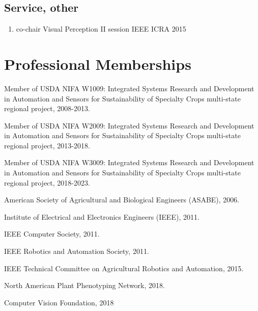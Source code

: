 \documentclass[letterpaper,11pt]{article}
\begin{document}
\subsection{Service, other}
\begin{enumerate}[noitemsep, leftmargin=*,label={}]
\item{co-chair Visual Perception II session IEEE ICRA 2015}
\end{enumerate}

\section{Professional Memberships}
\begin{enumerate}[noitemsep, leftmargin=*,label={[\arabic*]}]
\item{Member of USDA NIFA W1009: Integrated Systems Research and Development in Automation and Sensors for Sustainability of Specialty Crops multi-state regional project, 2008-2013. }
\item{Member of USDA NIFA W2009: Integrated Systems Research and Development in Automation and Sensors for Sustainability of Specialty Crops multi-state regional project, 2013-2018. }
\item{Member of USDA NIFA W3009: Integrated Systems Research and Development in Automation and Sensors for Sustainability of Specialty Crops multi-state regional project, 2018-2023. }
\item{American Society of Agricultural and Biological Engineers (ASABE), 2006.}
\item{Institute of Electrical and Electronics Engineers (IEEE), 2011.}
\item{IEEE Computer Society, 2011.}
\item{IEEE Robotics and Automation Society, 2011.}
\item{IEEE Technical Committee on Agricultural Robotics and Automation, 2015.}
\item{North American Plant Phenotyping Network, 2018.}
\item{Computer Vision Foundation, 2018}
\end{enumerate}

\end{document}
